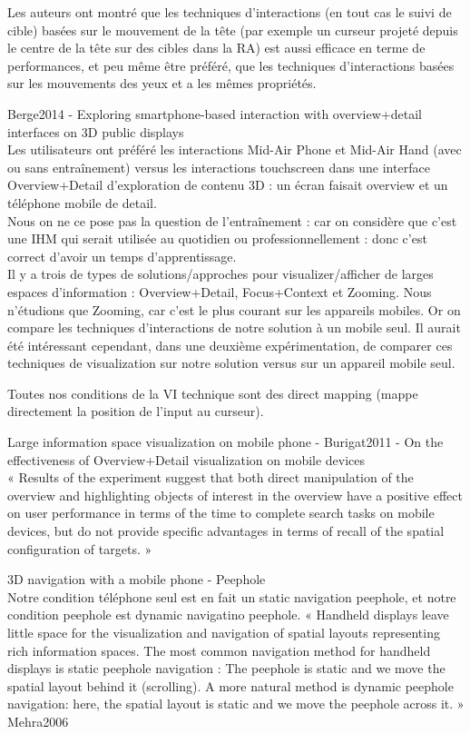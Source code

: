 Les auteurs ont montré que les techniques d'interactions (en tout cas le suivi de cible) basées sur le mouvement de la tête (par exemple un curseur projeté depuis le centre de la tête sur des cibles dans la RA) est aussi efficace en terme de performances, et peu même être préféré, que les techniques d'interactions basées sur les mouvements des yeux et a les mêmes propriétés.

Berge2014 - Exploring smartphone-based interaction with overview+detail interfaces on 3D public displays\\
Les utilisateurs ont préféré les interactions Mid-Air Phone et Mid-Air Hand (avec ou sans entraînement) versus les interactions touchscreen dans une interface Overview+Detail d'exploration de contenu 3D : un écran faisait overview et un téléphone mobile de detail.\\
Nous on ne ce pose pas la question de l'entraînement : car on considère que c'est une IHM qui serait utilisée au quotidien ou professionnellement : donc c'est correct d'avoir un temps d'apprentissage.\\
Il y a trois de types de solutions/approches pour visualizer/afficher de larges espaces d'information : Overview+Detail, Focus+Context et Zooming. Nous n'étudions que Zooming, car c'est le plus courant sur les appareils mobiles. Or on compare les techniques d'interactions de notre solution à un mobile seul. Il aurait été intéressant cependant, dans une deuxième expérimentation, de comparer ces techniques de visualization sur notre solution versus sur un appareil mobile seul.

Toutes nos conditions de la VI technique sont des direct mapping (mappe directement la position de l'input au curseur).

Large information space visualization on mobile phone - Burigat2011 - On the effectiveness of Overview+Detail visualization on mobile devices\\
« Results of the experiment suggest that both direct manipulation of the overview and highlighting objects of interest in the overview have a positive effect on user performance in terms of the time to complete search tasks on mobile devices, but do not provide specific advantages in terms of recall of the spatial configuration of targets. »

3D navigation with a mobile phone - Peephole\\
Notre condition téléphone seul est en fait un static navigation peephole, et notre condition peephole est dynamic navigatino peephole.
« Handheld displays leave little space for the visualization and navigation of spatial layouts representing rich information spaces. The most common navigation method for handheld displays is static peephole navigation : The peephole is static and we move the spatial layout behind it (scrolling). A more natural method is dynamic peephole navigation: here, the spatial layout is static and we move the peephole across it. » Mehra2006


